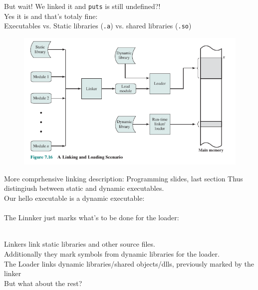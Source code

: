 \documentclass[10pt]{beamer}
\begin{document}
\begin{frame}{}
    
    But wait! We linked it and \texttt{puts} is still undefined?! \vspace{0.35cm}  \\
    Yes it is and that's totaly fine: \vspace{0.35cm} \\
    Executables vs. Static libraries (\texttt{.a}) vs. shared libraries (\texttt{.so}) \vspace{0.35cm}  \\
    \begin{figure}
        \includegraphics[keepaspectratio, width=\textwidth, height=0.8\textheight-2\baselineskip-2\baselineskip]{img/linker_loader.png} \\
    \end{figure}
    \framebreak
    
    More comprhensive linking description: Programming slides, last section
    Thus distingiush between static and dynamic executables. \vspace{0.35cm}  \\
    Our hello executable is a dynamic executable: \vspace{0.35cm} \\
      \vspace{0.35cm} \\
    The Linnker just marks what's to be done for the loader:  \vspace{0.35cm}  \\
     \\
    \framebreak
    
    Linkers link static libraries and other source files.  \\
    Additionally they mark symbols from dynamic libraries for the loader. \vspace{0.5cm}  \\
    The Loader links dynamic libraries/shared objects/dlls, previously marked by the linker  \vspace{0.9cm} \\
    But what about the rest?
    \framebreak
    

\end{frame}
\end{document}
